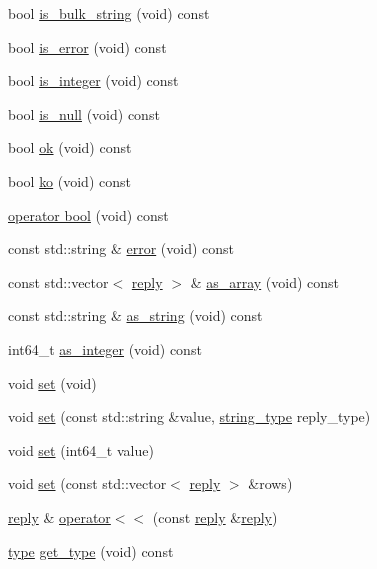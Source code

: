 \begin{DoxyCompactItemize}
\item 
bool \hyperlink{classcpp__redis_1_1reply_ab1f4e57a33fb438ab165a65f2d31ca8d}{is\+\_\+bulk\+\_\+string} (void) const
\item 
bool \hyperlink{classcpp__redis_1_1reply_af61ba1b5a0617c0036fb69e7ad5ee159}{is\+\_\+error} (void) const
\item 
bool \hyperlink{classcpp__redis_1_1reply_a75216234d6aafd8f81025b22bdbb4440}{is\+\_\+integer} (void) const
\item 
bool \hyperlink{classcpp__redis_1_1reply_ac9a967c09aad1cdc7ec3459a330ab274}{is\+\_\+null} (void) const
\item 
bool \hyperlink{classcpp__redis_1_1reply_a1270c4197e0ce79df996565f44011ac0}{ok} (void) const
\item 
bool \hyperlink{classcpp__redis_1_1reply_a17e261cc8e7686bb2126d7df9223611a}{ko} (void) const
\item 
\hyperlink{classcpp__redis_1_1reply_a74ef4651c068bfc68436f7e3c7a9a2e6}{operator bool} (void) const
\item 
const std\+::string \& \hyperlink{classcpp__redis_1_1reply_a8e4d3fe1636627fdee6361705a2b1c1e}{error} (void) const
\item 
const std\+::vector$<$ \hyperlink{classcpp__redis_1_1reply}{reply} $>$ \& \hyperlink{classcpp__redis_1_1reply_af4ead6a79c9e531912c35267d5212776}{as\+\_\+array} (void) const
\item 
const std\+::string \& \hyperlink{classcpp__redis_1_1reply_a5fdd9c1d3bb3b9ece6098f8b83a32597}{as\+\_\+string} (void) const
\item 
int64\+\_\+t \hyperlink{classcpp__redis_1_1reply_a5f54d0dada956bca564ff2d7bde866ea}{as\+\_\+integer} (void) const
\item 
void \hyperlink{classcpp__redis_1_1reply_a2489d293128b2d567663a9d7fbbbc33e}{set} (void)
\item 
void \hyperlink{classcpp__redis_1_1reply_a9306dcc36a6a009a2b0f4923735f6349}{set} (const std\+::string \&value, \hyperlink{classcpp__redis_1_1reply_ac192ba4cb8f2bb6e7cb465edf755328b}{string\+\_\+type} reply\+\_\+type)
\item 
void \hyperlink{classcpp__redis_1_1reply_a2443bd6d4fb35279db198ba876e1ad34}{set} (int64\+\_\+t value)
\item 
void \hyperlink{classcpp__redis_1_1reply_ab64ee3720832e60ed47b91fd5b3045bd}{set} (const std\+::vector$<$ \hyperlink{classcpp__redis_1_1reply}{reply} $>$ \&rows)
\item 
\hyperlink{classcpp__redis_1_1reply}{reply} \& \hyperlink{classcpp__redis_1_1reply_a4f2a05711b5db6b53108cb9eec4e19be}{operator$<$$<$} (const \hyperlink{classcpp__redis_1_1reply}{reply} \&\hyperlink{classcpp__redis_1_1reply}{reply})
\item 
\hyperlink{classcpp__redis_1_1reply_acc272b2a52164cac1d110c619a0b25bd}{type} \hyperlink{classcpp__redis_1_1reply_ab196726881aea799186228d49a2283ba}{get\+\_\+type} (void) const
\end{DoxyCompactItemize}
